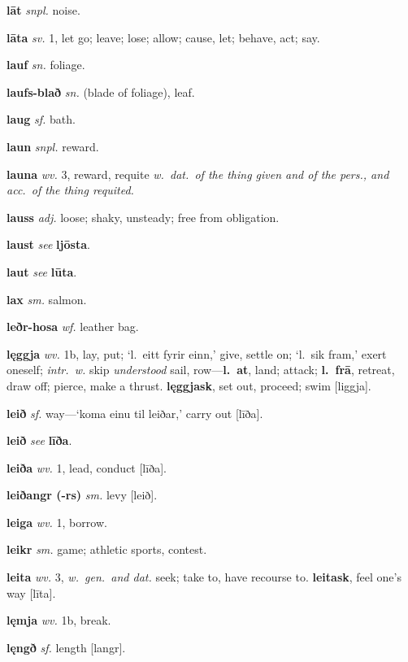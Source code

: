 \documentclass[12pt,letterpaper]{book}
\begin{document}
\noindent
\textbf{lāt} \textit{snpl.} noise.

\noindent
\textbf{lāta} \textit{sv.} 1, let go; leave; lose; allow; cause, let;
	behave, act; say.

\noindent
\textbf{lauf} \textit{sn.} foliage.

\noindent
\textbf{laufs-blað} \textit{sn.} (blade of foliage), leaf.

\noindent
\textbf{laug} \textit{sf.} bath.

\noindent
\textbf{laun} \textit{snpl.} reward.

\noindent
\textbf{launa} \textit{wv.} 3, reward, requite \textit{w.\ dat.\ of the
	thing given and of the pers., and acc.\ of the thing requited.}

\noindent
\textbf{lauss} \textit{adj.} loose; shaky, unsteady; free from obligation.

\noindent
\textbf{laust} \textit{} \textit{see} \textbf{ljōsta}.

\noindent
\textbf{laut} \textit{} \textit{see} \textbf{lūta}.

\noindent
\textbf{lax} \textit{sm.} salmon.

\noindent
\textbf{leðr-hosa} \textit{wf.} leather bag.

\noindent
\textbf{lęggja} \textit{wv.} 1b, lay, put; `l.\ eitt fyrir einn,' give,
	settle on; `l.\ sik fram,' exert oneself; \textit{intr.\ w.} skip
    \textit{understood} sail, row---\textbf{l.\ at}, land; attack; \textbf{l.\ frā},
    retreat, draw off; pierce, make a thrust.  \textbf{lęggjask}, set
    out, proceed; swim [liggja].

\noindent
\textbf{leið} \textit{sf.} way---`koma einu til leiðar,' carry out [līða].

\noindent
\textbf{leið} \textit{} \textit{see} \textbf{līða}.

\noindent
\textbf{leiða} \textit{wv.} 1, lead, conduct [līða].

\noindent
\textbf{leiðangr (-rs)} \textit{sm.} levy [leið].

\noindent
\textbf{leiga} \textit{wv.} 1, borrow.

\noindent
\textbf{leikr} \textit{sm.} game; athletic sports, contest.

\noindent
\textbf{leita} \textit{wv.} 3, \textit{w.\ gen.\ and dat.} seek; take to, have
	recourse to.  \textbf{leitask}, feel one's way [līta].

\noindent
\textbf{lęmja} \textit{wv.} 1b, break.

\noindent
\textbf{lęngð} \textit{sf.} length [langr].
\end{document}
